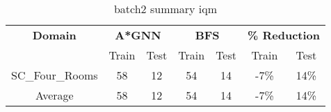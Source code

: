 \begin{table}[!ht]
  \small
  \centering
  \begin{tabular}{c|cc|cc|cc}
    \textbf{Domain}
      & \multicolumn{2}{c|}{\textbf{A*GNN}}
      & \multicolumn{2}{c|}{\textbf{BFS}}
      & \multicolumn{2}{c}{\textbf{\% Reduction}} \\
    \cline{2-7}
    & Train & Test & Train & Test & Train & Test \\
    \hline

    SC\_Four\_Rooms & 58 & 12 & 54 & 14 & -7\% & 14\% \\
    \hline
    Average & 58 & 12 & 54 & 14 & -7\% & 14\% \\

  \end{tabular}
  \caption{batch2 summary iqm}
  \label{tab:batch2_res}
\end{table}
